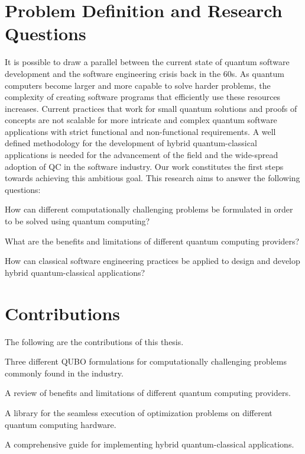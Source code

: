 \section{Problem Definition and Research Questions}
\label{sect:introduction--problem}

It is possible to draw a parallel between the current state of quantum software development and the software engineering crisis back in the 60s. As quantum computers become larger and more capable to solve harder problems, the complexity of creating software programs that efficiently use these resources increases. Current practices that work for small quantum solutions and proofs of concepts are not scalable for more intricate and complex quantum software applications with strict functional and non-functional requirements. A well defined methodology for the development of hybrid quantum-classical applications is needed for the advancement of the field and the wide-spread adoption of QC in the software industry. Our work constitutes the first steps towards achieving this ambitious goal.
This research aims to answer the following questions:

\begin{description}[leftmargin=3.5em]
	\item[Q1:] How can different computationally challenging problems be formulated in order to be solved using quantum computing?
	\item[Q2:] What are the benefits and limitations of different quantum computing providers? 
	\item[Q3:] How can classical software engineering practices be applied to design and develop hybrid quantum-classical applications?
\end{description}

\section{Contributions}
\label{sect:introduction--contributions}

The following are the contributions of this thesis.

\begin{description}[leftmargin=3.5em]
	\item[C1:] Three different QUBO formulations for computationally challenging problems commonly found in the industry. 
	\item[C2:] A review of benefits and limitations of different quantum computing providers.
	\item[C3:] A library for the seamless execution of optimization problems on different quantum computing hardware. 
    \item[C3:] A comprehensive guide for implementing hybrid quantum-classical applications.
\end{description}



